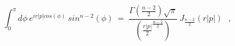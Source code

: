 \begin{equation}
\int _{0}^{\pi} d\phi~e^{ir|p|cos(\phi)}~sin^{n-2}(\phi) ~ =~
\frac {\Gamma(\frac{n-2}{2}) \sqrt {\pi} }{(\frac{r|p|}{2}^{\frac{n-2}{2} }) }
~J_{\frac{n-2}{2}}(r|p|) ~~~,
\end{equation}

